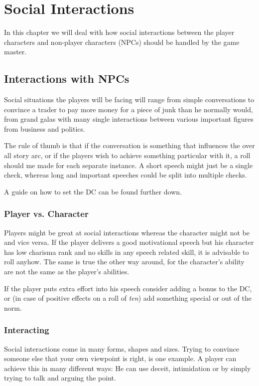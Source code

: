\chapter{Social Interactions}

In this chapter we will deal with how social interactions between the player
characters and non-player characters (NPCs) should be handled by the game
master.

\section{Interactions with NPCs}

Social situations the players will be facing will range from simple
conversations to convince a trader to pay more money for a piece of junk than
he normally would, from grand galas with many single interactions between
various important figures from business and politics.

The rule of thumb is that if the conversation is something that influences the
over all story arc, or if the players wish to achieve something particular
with it, a roll should me made for each separate instance. A short speech
might just be a single check, whereas long and important speeches could be
split into multiple checks.

A guide on how to set the DC can be found further down.

\subsection{Player vs. Character}

Players might be great at social interactions whereas the character might not
be and vice versa. If the player delivers a good motivational speech but his
character has low charisma rank and no skills in any speech related skill, it
is advisable to roll anyhow. The same is true the other way around, for the
character's ability are not the same as the player's abilities.

If the player puts extra effort into his speech consider adding a bonus to
the DC, or (in case of positive effects on a roll of \emph{ten}) add something
special or out of the norm.

\subsection{Interacting}

Social interactions come in many forms, shapes and sizes. Trying to convince
someone else that your own viewpoint is right, is one example. A player can
achieve this in many different ways: He can use deceit, intimidation or by
simply trying to talk and arguing the point.

